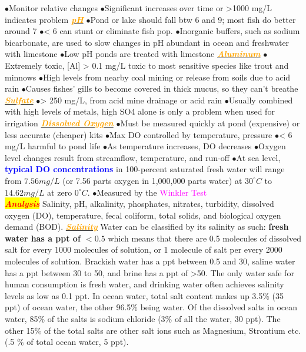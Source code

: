 \documentclass{article}
\newcommand{\ddd}{$\bullet$}
\newcommand{\red}[1]{\textcolor{red}{#1}}
\newcommand{\blue}[1]{\textcolor{blue}{#1}}
\newcommand{\pink}[1]{\textcolor{magenta}{#1}}
\newcommand{\orange}[1]{\textcolor{orange}{#1}}
\newcommand{\mysection}[1]{\colorbox{yellow}{\textbf{\textit{\red{#1}}}}}
\newcommand{\mysubsection}[1]{\underline{\textbf{{\textit{\orange{#1}}}}}}
\newcommand{\vocab}[1]{{\pink{#1}}}
\begin{document}
\begin{multicols*}{4}
            \ddd Monitor relative changes
            \ddd Significant increases over time or >1000 mg/L indicates problem
        \mysubsection{pH}
            \ddd Pond or lake should fall btw 6 and 9; most fish do better around 7
            \ddd < 6 can stunt or eliminate fish pop.
            \ddd Inorganic buffers, such as sodium bicarbonate, are used to slow changes in pH abundant in ocean and freshwater with limestone
            \ddd Low pH ponds are treated with limestone
        \mysubsection{Aluminum}
            \ddd Extremely toxic, [Al] > 0.1 mg/L toxic to most sensitive species like trout and minnows
            \ddd High levels from nearby coal mining or release from soils due to acid rain
            \ddd Causes fishes’ gills to become covered in thick mucus, so they can’t breathe
        \mysubsection{Sulfate}
            \ddd > 250 mg/L, from acid mine drainage or acid rain
            \ddd Usually combined with high levels of metals, high SO4 alone is only a problem when used for irrigation
        \mysubsection{Dissolved Oxygen}
            \ddd Must be measured quickly at pond (expensive) or less accurate (cheaper) kits
            \ddd Max DO controlled by temperature, pressure
            \ddd < 6 mg/L harmful to pond life
	        \ddd As temperature increases, DO decreases
	        \ddd Oxygen level changes result from streamflow, temperature, and run-off
	        \ddd At sea level, \textbf{\blue{typical DO concentrations}} in 100-percent saturated fresh water will range from $7.56 mg/L$ (or 7.56 parts oxygen in 1,000,000 parts water) at $30^\circ C$ to $14.62 mg/L$ at zero $0^\circ C$.
	        \ddd Measured by the \vocab{Winkler Test}
    \\
    \mysection{Analysis}
        Salinity, pH, alkalinity, phosphates, nitrates, turbidity, dissolved oxygen (DO), temperature, fecal coliform, total solids, and biological oxygen demand (BOD). 
        \mysubsection{Salinity}
            Water can be classified by its salinity as such: \textbf{fresh water has a ppt of $< 0.5$} which means that there are 0.5 molecules of dissolved salt for every 1000 molecules of solution, or 1 molecule of salt per every 2000 molecules of solution. Brackish water has a ppt between 0.5 and 30, saline water has a ppt between 30 to 50, and brine has a ppt of >50. The only water safe for human consumption is fresh water, and drinking water often achieves salinity levels as low as 0.1 ppt. In ocean water, total salt content makes up 3.5\% (35 ppt) of ocean water, the other 96.5\% being water. Of the dissolved salts in ocean water, 85\% of the salts is sodium chloride (3\% of all the water, 30 ppt). The other 15\% of the total salts are other salt ions such as Magnesium, Strontium etc. (.5 \% of total ocean water, 5 ppt). 

\end{multicols*}
\end{document}
